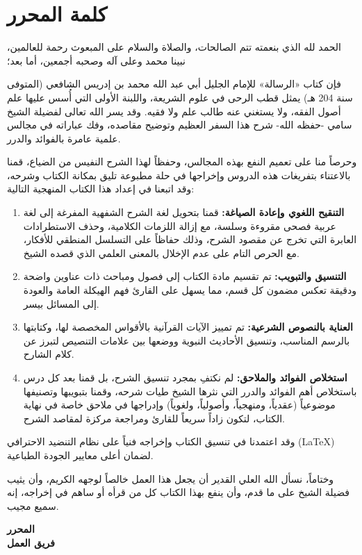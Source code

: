 \chapter*{كلمة المحرر}

الحمد لله الذي بنعمته تتم الصالحات، والصلاة والسلام على المبعوث رحمة للعالمين، نبينا محمد وعلى آله وصحبه أجمعين، أما بعد؛

فإن كتاب «الرسالة» للإمام الجليل أبي عبد الله محمد بن إدريس الشافعي (المتوفى سنة 204 هـ) يمثل قطب الرحى في علوم الشريعة، واللبنة الأولى التي أُسس عليها علم أصول الفقه، ولا يستغني عنه طالب علم ولا فقيه. وقد يسر الله تعالى لفضيلة الشيخ سامي -حفظه الله- شرح هذا السفر العظيم وتوضيح مقاصده، وفك عباراته في مجالس علمية عامرة بالفوائد والدرر.

وحرصاً منا على تعميم النفع بهذه المجالس، وحفظاً لهذا الشرح النفيس من الضياع، قمنا بالاعتناء بتفريغات هذه الدروس وإخراجها في حلة مطبوعة تليق بمكانة الكتاب وشرحه، وقد اتبعنا في إعداد هذا الكتاب المنهجية التالية:

\begin{enumerate}
    \item \textbf{التنقيح اللغوي وإعادة الصياغة:} قمنا بتحويل لغة الشرح الشفهية المفرغة إلى لغة عربية فصحى مقروءة وسلسة، مع إزالة اللزمات الكلامية، وحذف الاستطرادات العابرة التي تخرج عن مقصود الشرح، وذلك حفاظاً على التسلسل المنطقي للأفكار، مع الحرص التام على عدم الإخلال بالمعنى العلمي الذي قصده الشيخ.
    \item \textbf{التنسيق والتبويب:} تم تقسيم مادة الكتاب إلى فصول ومباحث ذات عناوين واضحة ودقيقة تعكس مضمون كل قسم، مما يسهل على القارئ فهم الهيكلة العامة والعودة إلى المسائل بيسر.
    \item \textbf{العناية بالنصوص الشرعية:} تم تمييز الآيات القرآنية بالأقواس المخصصة لها، وكتابتها بالرسم المناسب، وتنسيق الأحاديث النبوية ووضعها بين علامات التنصيص لتبرز عن كلام الشارح.
    \item \textbf{استخلاص الفوائد والملاحق:} لم نكتفِ بمجرد تنسيق الشرح، بل قمنا بعد كل درس باستخلاص أهم الفوائد والدرر التي نثرها الشيخ طيات شرحه، وقمنا بتبويبها وتصنيفها موضوعياً (عقدياً، ومنهجياً، وأصولياً، ولغوياً) وإدراجها في ملاحق خاصة في نهاية الكتاب، لتكون زاداً سريعاً للقارئ ومراجعة مركزة لمقاصد الشرح.
\end{enumerate}

وقد اعتمدنا في تنسيق الكتاب وإخراجه فنياً على نظام التنضيد الاحترافي (\LaTeX) لضمان أعلى معايير الجودة الطباعية.

وختاماً، نسأل الله العلي القدير أن يجعل هذا العمل خالصاً لوجهه الكريم، وأن يثيب فضيلة الشيخ على ما قدم، وأن ينفع بهذا الكتاب كل من قرأه أو ساهم في إخراجه، إنه سميع مجيب.

\vspace{1cm}
\noindent
\textbf{المحرر} \\
\textbf{فريق العمل}